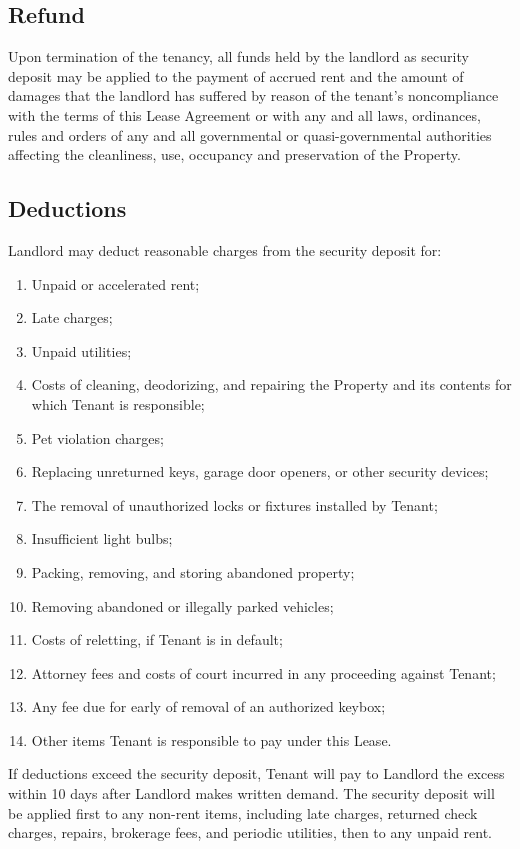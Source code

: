 \documentclass{amsart}
\begin{document}
\subsection{Refund}
Upon termination of the tenancy, all funds held by the landlord as security
deposit may be applied to the payment of accrued rent and the amount of damages
that the landlord has suffered by reason of the tenant's noncompliance with the
terms of this Lease Agreement or with any and all laws, ordinances, rules and
orders of any and all governmental or quasi-governmental authorities affecting
the cleanliness, use, occupancy and preservation of the Property.
\subsection{Deductions}
Landlord may deduct reasonable charges from the security deposit for:
\begin{enumerate}
    \item Unpaid or accelerated rent;
    \item Late charges;
    \item Unpaid utilities;
    \item Costs of cleaning, deodorizing, and repairing the Property and its contents for which Tenant is responsible;
    \item Pet violation charges;
    \item Replacing unreturned keys, garage door openers, or other security devices;
    \item The removal of unauthorized locks or fixtures installed by Tenant;
    \item Insufficient light bulbs;
    \item Packing, removing, and storing abandoned property;
    \item Removing abandoned or illegally parked vehicles;
    \item Costs of reletting, if Tenant is in default;
    \item Attorney fees and costs of court incurred in any proceeding against Tenant;
    \item Any fee due for early of removal of an authorized keybox;
    \item Other items Tenant is responsible to pay under this Lease.
\end{enumerate}
If deductions exceed the security deposit, Tenant will pay to Landlord the
excess within 10 days after Landlord makes written demand. The security deposit
will be applied first to any non-rent items, including late charges, returned
check charges, repairs, brokerage fees, and periodic utilities, then to any
unpaid rent.
\end{document}
